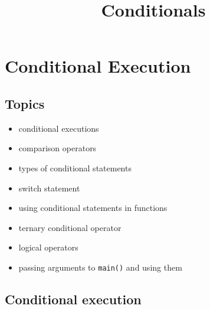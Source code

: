 \documentclass[11pt]{article}
\title{Conditionals}
\providecommand{\tightlist}{%
      \setlength{\itemsep}{0pt}\setlength{\parskip}{0pt}}
\begin{document}
    
    \maketitle
    
    

    
    \hypertarget{conditional-execution}{%
\section{Conditional Execution}\label{conditional-execution}}

\hypertarget{topics}{%
\subsection{Topics}\label{topics}}

\begin{itemize}
\tightlist
\item
  conditional executions
\item
  comparison operators
\item
  types of conditional statements
\item
  switch statement
\item
  using conditional statements in functions
\item
  ternary conditional operator
\item
  logical operators
\item
  passing arguments to \texttt{main()} and using them
\end{itemize}

\hypertarget{conditional-execution-1}{%
\subsection{Conditional execution}\label{conditional-execution-1}}
\end{document}
